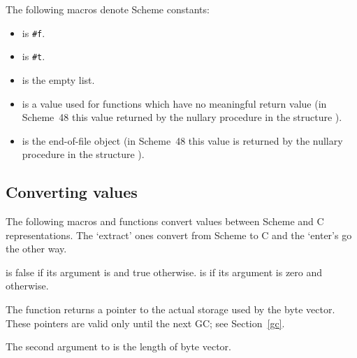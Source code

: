 The following macros denote Scheme constants:
%
\begin{itemize}
\item {} is \verb|#f|.
\item {} is \verb|#t|.
\item {} is the empty list.
\item {} is a value used for functions which have no
  meaningful return value
 (in Scheme~48 this value returned by the nullary procedure 
 in the structure ).
\item {} is the end-of-file object
 (in Scheme~48 this value is returned by the nullary procedure 
 in the structure ).
\end{itemize}

\subsection{Converting values}

The following macros and functions convert values between Scheme and C
 representations.
The `extract' ones convert from Scheme to C and the `enter's go the other
 way.

\begin{protos}
\end{protos}

\noindent{} is false if its argument is
  and true otherwise.
  is  if its argument is zero
  and  otherwise.

 The  function returns a
 pointer to the actual
 storage used by the byte vector.
 These pointers are valid only until the next GC; see Section~\ref{gc}.

The second argument to  is the length of
 byte vector.

